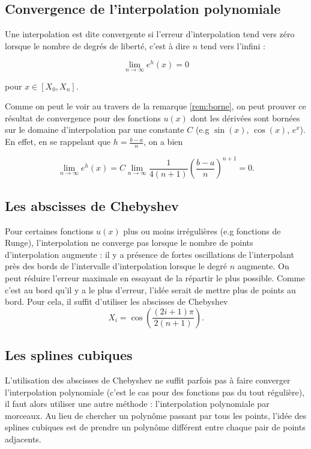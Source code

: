 \subsection{Convergence de l'interpolation polynomiale}
\begin{mydef}
	Une interpolation est dite convergente si l'erreur d'interpolation tend vers
	zéro lorsque le nombre de degrés de liberté, c'est à dire $n$ tend vers l'infini :
	
	$$\lim_{n \to \infty} e^h(x) = 0$$
	
	pour $x \in [X_0, X_n]$.
\end{mydef}

Comme on peut le voir au travers de la remarque \ref{rem:borne}, on peut prouver 
ce résultat de convergence pour des fonctions $u(x)$ dont les dérivées sont
bornées sur le domaine d'interpolation par une constante $C$ (e.g $\sin(x)$, $\cos(x)$, $e^x$).
En effet, en se rappelant que $h = \frac{b-a}{n}$, on a bien 

$$\lim_{n \to \infty} e^h(x) = C \lim_{n \to \infty} \frac{1}{4(n+1)}(\frac{b-a}{n})^{n+1} = 0.$$

\subsection{Les abscisses de Chebyshev}
Pour certaines fonctions $u(x)$ plus ou moins irrégulières (e.g fonctions de Runge),
l'interpolation ne converge pas lorsque le nombre de points d'interpolation
augmente : il y a présence de fortes oscillations de l'interpolant près des
bords de l'intervalle d'interpolation lorsque le degré $n$ augmente.
On peut réduire l'erreur maximale en essayant de la répartir le plus possible.
Comme c'est au bord qu'il y a le plus d'erreur, l'idée serait de mettre
plus de points au bord.
Pour cela, il suffit d'utiliser les abscisses de Chebyshev
\[ X_i = \cos\left(\frac{(2i+1)\pi}{2(n+1)}\right). \]

\subsection{Les splines cubiques}
L'utilisation des abscisses de Chebyshev ne suffit parfois pas à faire converger
l'interpolation polynomiale (c'est le cas pour des fonctions pas du tout régulière),
il faut alors utiliser une autre méthode : l'interpolation polynomiale par morceaux.
Au lieu de chercher un polynôme passant par tous les points, l'idée des
splines cubiques est de prendre un polynôme différent entre chaque pair
de points adjacents.

